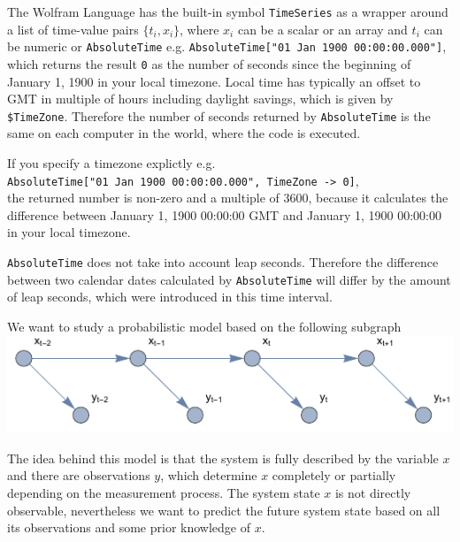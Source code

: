 \documentclass{tstextbook}
\begin{document}
The Wolfram Language has the built-in symbol \texttt{TimeSeries} as a wrapper around a list of time-value pairs $\{t_{i},x_{i}\}$, where $x_{i}$ can be a scalar or an array and $t_{i}$ can be numeric or \texttt{AbsoluteTime} e.g. \texttt{AbsoluteTime["01 Jan 1900 00:00:00.000"]}, which returns the result \texttt{0} as the number of seconds since the beginning of January 1, 1900 in your local timezone. Local time has typically an offset to GMT in multiple of hours including daylight savings, which is given by \texttt{\$TimeZone}. Therefore the number of seconds returned by \texttt{AbsoluteTime} is the same on each computer in the world, where the code is executed.

\begin{remark}
If you specify a timezone explictly e.g.\\

\texttt{AbsoluteTime["01 Jan 1900 00:00:00.000", TimeZone -> 0]},\\

the returned number is non-zero and a multiple of 3600, because it calculates the difference between January 1, 1900 00:00:00 GMT and January 1, 1900 00:00:00 in your local timezone.
\end{remark}

\begin{remark}
\texttt{AbsoluteTime} does not take into account leap seconds. Therefore the difference between two calendar dates calculated by \texttt{AbsoluteTime} will differ by the amount of leap seconds, which were introduced in this time interval.   
\end{remark}

We want to study a probabilistic model based on the following subgraph\\
     
\includegraphics[scale=1.2, center]{images/time_series_graph.pdf}

The idea behind this model is that the system is fully described by the variable $x$ and there are observations $y$, which determine $x$ completely or partially depending on the measurement process. The system state $x$ is not directly observable, nevertheless we want to predict the future system state based on all its observations and some prior knowledge of $x$.\\
\end{document}
